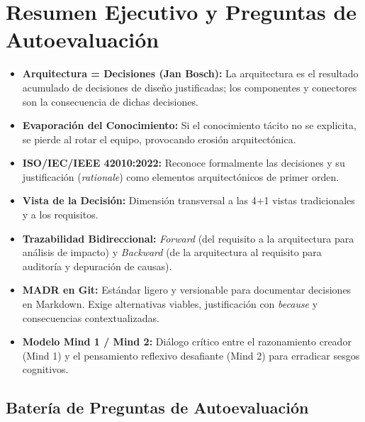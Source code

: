 \section{Resumen Ejecutivo y Preguntas de Autoevaluación}
\label{sec:resumen-tema3}

\begin{tcolorbox}[
  enhanced,
  colback=secondary!5!bglight,
  colframe=secondary,
  arc=3mm,
  boxrule=1pt,
  title={\bfseries\color{white} Resumen de Conceptos Clave del Tema 3},
  coltitle=white
]
\begin{itemize}[leftmargin=1.5em]
  \item \textbf{Arquitectura = Decisiones (Jan Bosch):} La arquitectura es el resultado acumulado de decisiones de diseño justificadas; los componentes y conectores son la consecuencia de dichas decisiones.
  \item \textbf{Evaporación del Conocimiento:} Si el conocimiento tácito no se explicita, se pierde al rotar el equipo, provocando erosión arquitectónica.
  \item \textbf{ISO/IEC/IEEE 42010:2022:} Reconoce formalmente las decisiones y su justificación (\emph{rationale}) como elementos arquitectónicos de primer orden.
  \item \textbf{Vista de la Decisión:} Dimensión transversal a las 4+1 vistas tradicionales y a los requisitos.
  \item \textbf{Trazabilidad Bidireccional:} \emph{Forward} (del requisito a la arquitectura para análisis de impacto) y \emph{Backward} (de la arquitectura al requisito para auditoría y depuración de causas).
  \item \textbf{MADR en Git:} Estándar ligero y versionable para documentar decisiones en Markdown. Exige alternativas viables, justificación con \emph{because} y consecuencias contextualizadas.
  \item \textbf{Modelo Mind 1 / Mind 2:} Diálogo crítico entre el razonamiento creador (Mind 1) y el pensamiento reflexivo desafiante (Mind 2) para erradicar sesgos cognitivos.
\end{itemize}
\end{tcolorbox}

\subsection{Batería de Preguntas de Autoevaluación}

